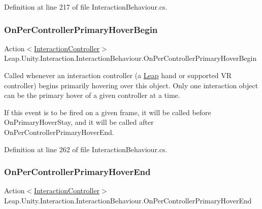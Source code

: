 Definition at line 217 of file Interaction\+Behaviour.\+cs.

\mbox{\label{class_leap_1_1_unity_1_1_interaction_1_1_interaction_behaviour_a77282ddce732330c800e17a8f97686d0}} 
\subsubsection{\texorpdfstring{OnPerControllerPrimaryHoverBegin}{OnPerControllerPrimaryHoverBegin}}
{\footnotesize\ttfamily Action$<$\mbox{\hyperlink{class_leap_1_1_unity_1_1_interaction_1_1_interaction_controller}{Interaction\+Controller}}$>$ Leap.\+Unity.\+Interaction.\+Interaction\+Behaviour.\+On\+Per\+Controller\+Primary\+Hover\+Begin}



Called whenever an interaction controller (a \mbox{\hyperlink{namespace_leap_1_1_unity_1_1_leap}{Leap}} hand or supported VR controller) begins primarily hovering over this object. Only one interaction object can be the primary hover of a given controller at a time. 

If this event is to be fired on a given frame, it will be called before On\+Primary\+Hover\+Stay, and it will be called after On\+Per\+Controller\+Primary\+Hover\+End. 

Definition at line 262 of file Interaction\+Behaviour.\+cs.

\mbox{\label{class_leap_1_1_unity_1_1_interaction_1_1_interaction_behaviour_a4cbf311d8cede813d39dcdfddc6d5582}} 
\subsubsection{\texorpdfstring{OnPerControllerPrimaryHoverEnd}{OnPerControllerPrimaryHoverEnd}}
{\footnotesize\ttfamily Action$<$\mbox{\hyperlink{class_leap_1_1_unity_1_1_interaction_1_1_interaction_controller}{Interaction\+Controller}}$>$ Leap.\+Unity.\+Interaction.\+Interaction\+Behaviour.\+On\+Per\+Controller\+Primary\+Hover\+End}



